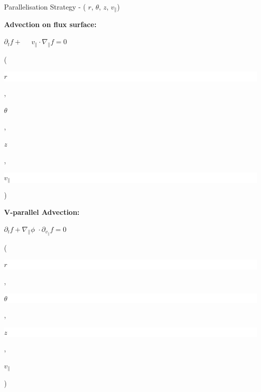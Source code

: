 \documentclass{beamer}
\begin{document}
\begin{frame}{Parallelisation Strategy - ( $r$, $\theta$, $z$, $v_\parallel$)}
\begin{minipage}[t]{.45\textwidth}
 \bf Advection on flux surface:
 \end{minipage}
 \hspace{.1\textwidth}
 \begin{minipage}[t]{.4\textwidth}
 $\partial_t f + \,\,\,\,\,\,\,\, v_\parallel \cdot \nabla_\parallel f = 0$
\end{minipage}
(\colorbox{white}{\strut $r$},\colorbox{contigColor}{\strut $\theta$},\colorbox{contigColor}{\strut $z$},\colorbox{white}{\strut $v_\parallel$})
%
\vspace{.5em}

\vspace{1em}

\begin{minipage}[t]{.45\textwidth}
 \bf V-parallel Advection:
 \end{minipage}
 \hspace{.1\textwidth}
 \begin{minipage}[t]{.4\textwidth}
 $\partial_t f + \nabla_\parallel \phi\,\, \cdot \partial_{v_{\parallel}} f = 0$
\end{minipage}
(\colorbox{white}{\strut $r$},\colorbox{white}{\strut $\theta$},\colorbox{white}{\strut $z$},\colorbox{contigColor}{\strut $v_\parallel$})
%
\vspace{.5em}

\vspace{1em}


\end{frame}
\end{document}
